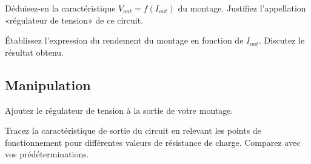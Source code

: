 \documentclass{../template/labo}
\begin{document}
\Question
{
	Déduisez-en la caractéristique $V_{out} = f(I_{out})$ du montage.
	Justifiez l'appellation «régulateur de tension» de ce circuit.
}
{}%
	\label{Q:24}

%
%	
%	
%	
%	
%	
%
\Question
{
	Établissez l'expression du rendement du montage en fonction de $I_{out}$.
	Discutez le résultat obtenu.
}
{}%
	\label{Q:25}

\vspace{-0.5cm}
%
%
%	
%	
\subsection{Manipulation}
\Question
{
	Ajoutez le régulateur de tension à la sortie de votre montage.
}
{}%
	\label{Q:26}

\Question
{
	Tracez la caractéristique de sortie du circuit en relevant les points de fonctionnement pour différentes valeurs de résistance de charge. Comparez avec vos prédéterminations.
}
{}%
	\label{Q:27}

\end{document}
